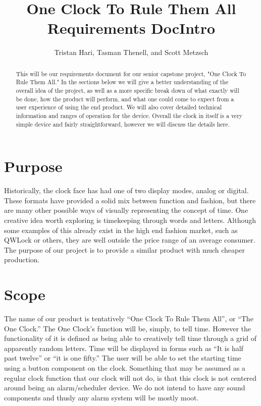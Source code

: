 \documentclass[10pt,draftclsnofoot,onecolumn]{IEEEtran}
\begin{document}
\title{One Clock To Rule Them All Requirements Doc}
\author{Tristan Hari, Tasman Thenell, and Scott Metzsch}
\maketitle
\begin{abstract}
This will be our requirements document for our senior capstone project, "One Clock To Rule Them All."
In the sections below we will give a better understanding of the overall idea of the project, as 
well as a more specific break down of what exactly will be done, how the product will perform, 
and what one could come to expect from a user experience of using the end product. We will also 
cover detailed technical information and ranges of operation for the device. Overall the clock in 
itself is a very simple device and fairly straightforward, however we will discuss the details here.
\end{abstract}
\IEEEpeerreviewmaketitle

\newpage
\tableofcontents
\newpage 
{}

\title{Intro}
\section{Purpose}
Historically, the clock face has had one of two display modes, analog or digital.
These formats have provided a solid mix between function and fashion, but there are many 
other possible ways of visually representing the concept of time. One creative idea worth
exploring is timekeeping through words and letters. Although some examples of this already 
exist in the high end fashion market, such as QWLock or others, they are well outside the 
price range of an average consumer. The purpose of our project is to provide a similar 
product with much cheaper production.

\section{Scope}
The name of our product is tentatively “One Clock To Rule Them All”, or “The One Clock.” 
The One Clock’s function will be, simply, to tell time. However the functionality of it is 
defined as being able to creatively tell time through a grid of apparently random letters. 
Time will be displayed in forms such as “It is half past twelve” or “it is one fifty.” The 
user will be able to set the starting time using a button component on the clock. Something 
that may be assumed as a regular clock function that our clock will not do, is that this clock
 is not centered around being an alarm/scheduler device. We do not intend to have any sound 
 components and thusly any alarm system will be mostly moot. 
\end{document}
